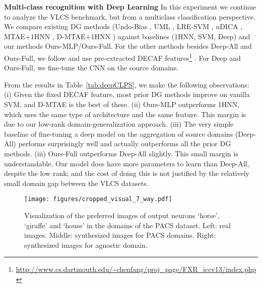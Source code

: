 \documentclass[10pt,twocolumn,letterpaper]{article}
\begin{document}
\vspace{0.2cm}\noindent\textbf{Multi-class recognition with Deep Learning}\quad
In this experiment we continue to analyze the VLCS benchmark, but from a multiclass classification perspective. We compare existing DG methods (Undo-Bias \cite{ECCV12_Khosla}, UML \cite{fang2013unbiased}, LRE-SVM \cite{xu2014exploiting}, uDICA \cite{muandet2013domainGen}, MTAE+1HNN \cite{ghifary2015domain}, D-MTAE+1HNN \cite{ghifary2015domain}) against baselines (1HNN, SVM, Deep) and our methods Ours-MLP/Ours-Full. For the other methods besides Deep-All and Ours-Full, we follow \cite{ghifary2015domain} and use pre-extracted DECAF features\footnote{\url{http://www.cs.dartmouth.edu/~chenfang/proj_page/FXR_iccv13/index.php}} \cite{donahue2014decaf}. For Deep and Ours-Full, we fine-tune the CNN on the source domains.

From the results in Table~\ref{tab:deepCLPS}, we make the following observations: (i) Given the fixed DECAF feature, most prior DG methods improve on vanilla SVM, and D-MTAE \cite{ghifary2015domain} is the best of these. (ii) Ours-MLP outperforms 1HNN, which uses the same type of architecture 
and the same feature. This margin is due to our low-rank domain-generalization approach. (iii) The very simple baseline of fine-tuning a deep model on the aggregation of source domains (Deep-All) performs surprisingly well and actually outperforms all the prior DG methods. (iii) Ours-Full outperforms Deep-All slightly. This small margin is understandable. Our model does have more parameters to learn than Deep-All, despite the low rank; and the cost of doing this is not justified by the relatively small domain gap between the VLCS datasets.
 


\begin{figure*}[!t]
\centering
\texttt{[image: figures/cropped\_visual\_7\_way.pdf]}
\caption{Visualization of the preferred images of output neurons `horse', `giraffe' and `house' in the domains of the PACS dataset. Left: real images. Middle: synthesized images for PACS domains. Right: synthesized images for agnostic domain.}
\label{fig:visualization4domain}
\end{figure*}
\end{document}
